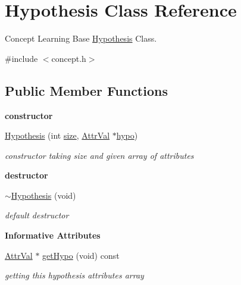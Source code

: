 \hypertarget{class_hypothesis}{\section{Hypothesis Class Reference}
\label{class_hypothesis}
}


Concept Learning Base \hyperlink{class_hypothesis}{Hypothesis} Class.  




{\ttfamily \#include $<$concept.\-h$>$}

\subsection*{Public Member Functions}
\begin{Indent}{\bf constructor}\par
\begin{DoxyCompactItemize}
\item 
\hyperlink{class_hypothesis_a727243cdba845a01b04f8f194e23f680}{Hypothesis} (int \hyperlink{class_hypothesis_a2fda5511fef4765414c3229ea6780e1e}{size}, \hyperlink{concept_8h_a9680d29b8d997e4adbf99481b65e897d}{Attr\-Val} $\ast$\hyperlink{class_hypothesis_a01481da71fa839150188db4720b02439}{hypo})
\begin{DoxyCompactList}\small\item\em constructor taking size and given array of attributes \end{DoxyCompactList}\end{DoxyCompactItemize}
\end{Indent}
\begin{Indent}{\bf destructor}\par
\begin{DoxyCompactItemize}
\item 
\hyperlink{class_hypothesis_acfa0ddc17cf13b4bea420119e85e0b85}{$\sim$\-Hypothesis} (void)
\begin{DoxyCompactList}\small\item\em default destructor \end{DoxyCompactList}\end{DoxyCompactItemize}
\end{Indent}
\begin{Indent}{\bf Informative Attributes}\par
\begin{DoxyCompactItemize}
\item 
\hyperlink{concept_8h_a9680d29b8d997e4adbf99481b65e897d}{Attr\-Val} $\ast$ \hyperlink{class_hypothesis_a601cd415f0c319f3be507951336d3bda}{get\-Hypo} (void) const 
\begin{DoxyCompactList}\small\item\em getting this hypothesis attributes array \end{DoxyCompactList}\end{DoxyCompactItemize}
\end{Indent}
